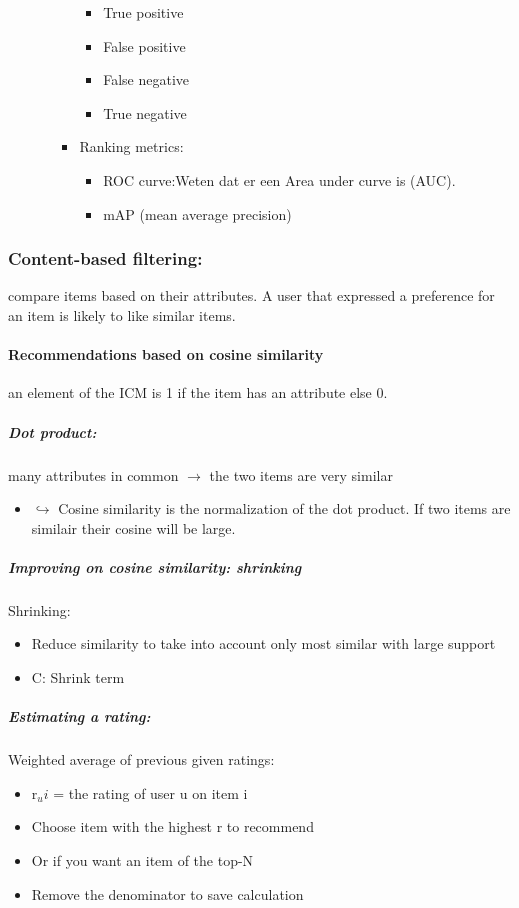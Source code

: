 \documentclass[12pt]{article}
\begin{document}
\begin{itemize}
\begin{itemize}
\begin{itemize}
\begin{itemize}
                \item True positive 
                \item False positive 
                \item False negative 
                \item True negative 
            \end{itemize}
            \item Ranking metrics:\begin{itemize}
                \item ROC curve:Weten dat er een Area under curve is (AUC).
                \item mAP (mean average precision)
            \end{itemize}
        \end{itemize}
    \end{itemize}
\end{itemize}
\subsubsection{Content-based filtering:}
compare items based on their attributes. A user that expressed a preference for an item is likely to like similar items.
\paragraph{Recommendations based on cosine similarity}
an element of the ICM is 1 if the item has an attribute else 0.
\subparagraph{Dot product:}
many attributes in common $\rightarrow$ the two items are very similar 
\begin{itemize}
    \item[] $\hookrightarrow$ Cosine similarity is the normalization of the dot product. If two items are similair their cosine will be large.
\end{itemize}
\subparagraph{Improving on cosine similarity: shrinking}
Shrinking:\begin{itemize}
    \item Reduce similarity to take into account only most similar with large support
    \item C: Shrink term
\end{itemize}
\subparagraph{Estimating a rating:}
Weighted average of previous given ratings:\begin{itemize}
    \item r$_ui$ = the rating of user u on item i
    \item Choose item with the highest r to recommend 
    \item Or if you want an item of the top-N 
    \item Remove the denominator to save calculation
\end{itemize}
\end{document}
